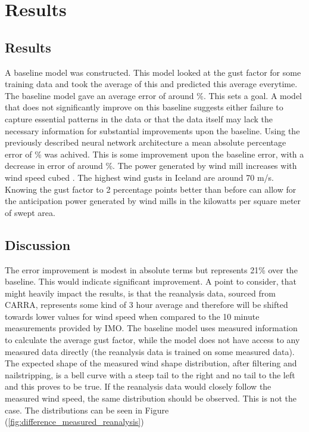 
\chapter{Results} %

\label{Chapter5} %


\section{Results}
A baseline model was constructed. This model looked at the gust factor for some training data and took the average of this and predicted this average everytime. The baseline model gave an average error of around \baselineerror\%. This sets a goal. A model that does not significantly improve on this baseline suggests either failure to capture essential patterns in the data or that the data itself may lack the necessary information for substantial improvements upon the baseline. Using the previously described neural network architecture a mean absolute percentage error of \modelerror\% was achived. This is some improvement upon the baseline error, with a decrease in error of around \errorImprovement\%. The power generated by wind mill increases with wind speed cubed \cite{wind_power}. The highest wind gusts in Iceland are around 70 m/s. Knowing the gust factor to 2 percentage points better than before can allow for the anticipation power generated by wind mills in the kilowatts per square meter of swept area.

\section{Discussion}
The error improvement is modest in absolute terms but represents 21\% over the baseline. This would indicate significant improvement. A point to consider, that might heavily impact the results, is that the reanalysis data, sourced from CARRA, represents some kind of 3 hour average and therefore will be shifted towards lower values for wind speed when compared to the 10 minute measurements provided by IMO. The baseline model uses measured information to calculate the average gust factor, while the model does not have access to any measured data directly (the reanalysis data is trained on some measured data). The expected shape of the measured wind shape distribution, after filtering and nailstripping, is a bell curve with a steep tail to the right and no tail to the left and this proves to be true. If the reanalysis data would closely follow the measured wind speed, the same distribution should be observed. This is not the case. The distributions can be seen in Figure (\ref{fig:difference_measured_reanalysis})

